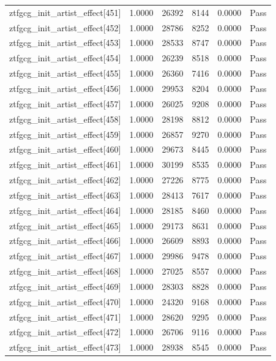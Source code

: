 \begin{table}[htbp]
\begin{tabular}{llrrll}
ztfgcg\_init\_artist\_effect[451] & 1.0000 & 26392 & 8144 & 0.0000 & Pass \\
ztfgcg\_init\_artist\_effect[452] & 1.0000 & 28786 & 8252 & 0.0000 & Pass \\
ztfgcg\_init\_artist\_effect[453] & 1.0000 & 28533 & 8747 & 0.0000 & Pass \\
ztfgcg\_init\_artist\_effect[454] & 1.0000 & 26239 & 8518 & 0.0000 & Pass \\
ztfgcg\_init\_artist\_effect[455] & 1.0000 & 26360 & 7416 & 0.0000 & Pass \\
ztfgcg\_init\_artist\_effect[456] & 1.0000 & 29953 & 8204 & 0.0000 & Pass \\
ztfgcg\_init\_artist\_effect[457] & 1.0000 & 26025 & 9208 & 0.0000 & Pass \\
ztfgcg\_init\_artist\_effect[458] & 1.0000 & 28198 & 8812 & 0.0000 & Pass \\
ztfgcg\_init\_artist\_effect[459] & 1.0000 & 26857 & 9270 & 0.0000 & Pass \\
ztfgcg\_init\_artist\_effect[460] & 1.0000 & 29673 & 8445 & 0.0000 & Pass \\
ztfgcg\_init\_artist\_effect[461] & 1.0000 & 30199 & 8535 & 0.0000 & Pass \\
ztfgcg\_init\_artist\_effect[462] & 1.0000 & 27226 & 8775 & 0.0000 & Pass \\
ztfgcg\_init\_artist\_effect[463] & 1.0000 & 28413 & 7617 & 0.0000 & Pass \\
ztfgcg\_init\_artist\_effect[464] & 1.0000 & 28185 & 8460 & 0.0000 & Pass \\
ztfgcg\_init\_artist\_effect[465] & 1.0000 & 29173 & 8631 & 0.0000 & Pass \\
ztfgcg\_init\_artist\_effect[466] & 1.0000 & 26609 & 8893 & 0.0000 & Pass \\
ztfgcg\_init\_artist\_effect[467] & 1.0000 & 29986 & 9478 & 0.0000 & Pass \\
ztfgcg\_init\_artist\_effect[468] & 1.0000 & 27025 & 8557 & 0.0000 & Pass \\
ztfgcg\_init\_artist\_effect[469] & 1.0000 & 28303 & 8828 & 0.0000 & Pass \\
ztfgcg\_init\_artist\_effect[470] & 1.0000 & 24320 & 9168 & 0.0000 & Pass \\
ztfgcg\_init\_artist\_effect[471] & 1.0000 & 28620 & 9295 & 0.0000 & Pass \\
ztfgcg\_init\_artist\_effect[472] & 1.0000 & 26706 & 9116 & 0.0000 & Pass \\
ztfgcg\_init\_artist\_effect[473] & 1.0000 & 28938 & 8545 & 0.0000 & Pass \\

\end{tabular}
\end{table}
